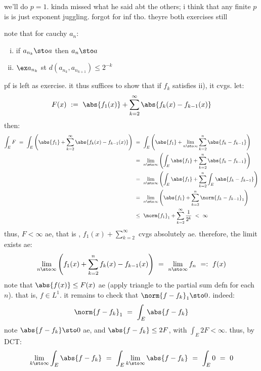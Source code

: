 \begin{pf}
	we'll do $p=1$. kinda missed what he said abt the others; i think that
	any finite $p$ is is just exponent juggling. forgot for inf tho.
	theyre both exercises still

	note that for cauchy $a_{n}$:
	\begin{enumerate}[i)]
		\item if $a_{n_{k}}\sto a$ then $a_{n}\sto a$
		\item $\ex a_{n_{k}}$ st $d(a_{n_{k}},a_{n_{k+1}})\leq2^{-k}$
	\end{enumerate}
	pf is left as exercise.
	it thus suffices to show that if $f_{k}$ satisfies ii), it cvgs. let:
	\begin{equation*}
		F(x) \ := \ \abs{f_{1}(x)}+\sum_{k=2}^{\infty}\abs{f_{k}(x)-f_{k-1}(x)}
	\end{equation*}
	then:
	\begin{align*}
		\int_{E}F
		\ = \ \int_{E}\left(\abs{f_{1}}+\sum_{k=2}^{\infty}\abs{f_{k}(x)-f_{k-1}(x)}\right)
		& \ = \ \int_{E}\left(\abs{f_{1}}+\lim_{n\sto\infty}\sum_{k=2}^{n}\abs{f_{k}-f_{k-1}}\right) \\
		& \ = \ \lim_{n\sto\infty}\left(\int_{E}\abs{f_{1}}+\sum_{k=2}^{n}\abs{f_{k}-f_{k-1}}\right) \\
		& \ = \ \lim_{n\sto\infty}\left(\int_{E}\abs{f_{1}}+\sum_{k=2}^{n}\int_{E}\abs{f_{k}-f_{k-1}}\right) \\
		& \ = \ \lim_{n\sto\infty}\left(\abs{f_{1}}+\sum_{k=2}^{n}\norm{f_{k}-f_{k-1}}_{1}\right) \\
		& \ \leq \ \norm{f_{1}}_{1} + \sum_{k=2}^{\infty}\frac{1}{2^{k}} \ < \ \infty
	\end{align*}
	thus, $F<\infty$ ae, that is , $f_{1}(x)+\sum_{k=2}^{\infty}$ cvgs absolutely ae.
	therefore, the limit exists ae:
	\begin{equation*}
		\lim_{n\sto\infty}\left(f_{1}(x)+\sum_{k=2}^{n}f_{k}(x)-f_{k-1}(x)\right)
		\ = \ \lim_{n\sto\infty}f_{n} \ =: \ f(x)
	\end{equation*}
	note that $\abs{f(x)}\leq F(x)$ ae (apply triangle to the partial sum defn for each $n$).
	that is, $f\in L^{1}$. it remains to check that $\norm{f-f_{k}}_{1}\sto0$.
	indeed:
	\begin{equation*}
		\norm{f-f_{k}}_{1} \ = \ \int_{E}\abs{f-f_{k}}
	\end{equation*}
	note $\abs{f-f_{k}}\sto0$ ae, and $\abs{f-f_{k}}\leq2F$, with $\int_{E}2F<\infty$.
	thus, by DCT:
	\begin{equation*}
		\lim_{k\sto\infty}\int_{E}\abs{f-f_{k}}
		\ = \ \int_{E}\lim_{k\sto\infty}\abs{f-f_{k}}
		\ = \ \int_{E}0 \ = \ 0
	\end{equation*}
\end{pf}
